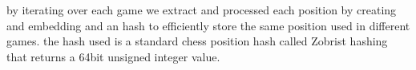 
by iterating over each game we extract and processed each position by creating and embedding and an hash to efficiently store the same position used in different games.
the hash used is a standard chess position hash called Zobrist hashing \cite{retrieval:zobristhash} that returns a 64bit unsigned integer value.


